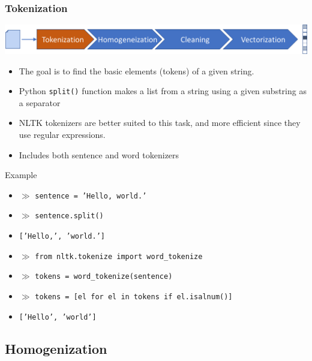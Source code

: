 \documentclass{beamer}
\begin{document}
\begin{frame}

    \frametitle{Tokenization}

    \centerline{\includegraphics[width=\textwidth]{./figs/NLPTM_tokenization.png}}

    \begin{itemize}
  
    	\item The goal is to find the basic elements (tokens) of a given string. 
    	\item Python {\tt split()} function makes a list from a string using a given substring as a separator
    	\item NLTK tokenizers are better suited to this task, and more efficient since they use regular expressions.
    	\item Includes both sentence and word tokenizers
    	
    \end{itemize}
    
    \footnotesize
    \begin{block}{Example}
    	\begin{itemize}
    		\footnotesize
    		\item[] $\gg$ {\tt sentence = 'Hello, world.'}
    		\item[] $\gg$ {\tt sentence.split()}
    		\item[] {\tt ['Hello,', 'world.']}
    		\item[] $\gg$ {\tt from nltk.tokenize import word\_tokenize}
    		\item[] $\gg$ {\tt tokens = word\_tokenize(sentence)}
    		\item[] $\gg$ {\tt tokens = [el for el in tokens if el.isalnum()]}
    		\item[] {\tt ['Hello', 'world']}
    	
    	\end{itemize}
    \end{block}
    
\end{frame}


\subsection{Homogenization}
\end{document}
